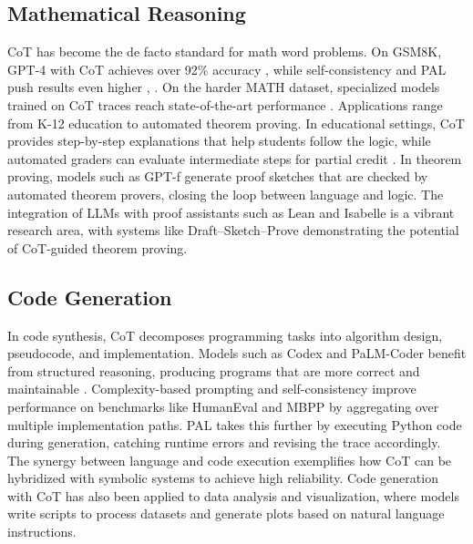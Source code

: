 \documentclass[11pt,a4paper]{article}
\begin{document}
\subsection{Mathematical Reasoning}
CoT has become the de facto standard for math word problems. On GSM8K, GPT-4 with CoT achieves over 92\% accuracy \citep{openai2023gpt4}, while self-consistency and PAL push results even higher \citep{gao2023pal}, \citep{wang2022self}. On the harder MATH dataset, specialized models trained on CoT traces reach state-of-the-art performance \citep{lightman2023let}. Applications range from K-12 education to automated theorem proving. In educational settings, CoT provides step-by-step explanations that help students follow the logic, while automated graders can evaluate intermediate steps for partial credit \citep{uesato2022solving}. In theorem proving, models such as GPT-f generate proof sketches that are checked by automated theorem provers, closing the loop between language and logic. The integration of LLMs with proof assistants such as Lean and Isabelle is a vibrant research area, with systems like Draft--Sketch--Prove demonstrating the potential of CoT-guided theorem proving.

\subsection{Code Generation}
In code synthesis, CoT decomposes programming tasks into algorithm design, pseudocode, and implementation. Models such as Codex and PaLM-Coder benefit from structured reasoning, producing programs that are more correct and maintainable \citep{chen2022program}. Complexity-based prompting \citep{fu2022complexity} and self-consistency \citep{wang2022self} improve performance on benchmarks like HumanEval and MBPP by aggregating over multiple implementation paths. PAL \citep{gao2023pal} takes this further by executing Python code during generation, catching runtime errors and revising the trace accordingly. The synergy between language and code execution exemplifies how CoT can be hybridized with symbolic systems to achieve high reliability. Code generation with CoT has also been applied to data analysis and visualization, where models write scripts to process datasets and generate plots based on natural language instructions.
\end{document}
